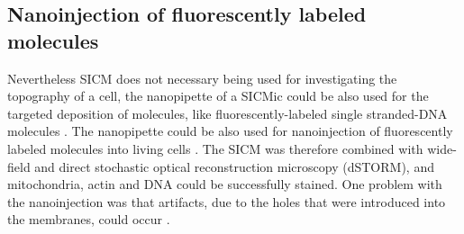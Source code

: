 
%

\subsection{Nanoinjection of fluorescently labeled molecules}

Nevertheless SICM does not necessary being used for investigating the topography of a cell, 
the nanopipette of a SICMic could be also used for the targeted deposition of molecules, like 
fluorescently-labeled single stranded-DNA molecules \cite{Ying2002,Hennig2015}. The nanopipette 
could be also used for nanoinjection of fluorescently labeled molecules into living cells 
\cite{Hennig2015a}. The SICM was therefore combined with wide-field and direct stochastic 
optical reconstruction microscopy (dSTORM), and mitochondria, actin and DNA could be successfully 
stained. One problem with the nanoinjection was that artifacts, due to the holes that were 
introduced into the membranes, could occur \cite{Hennig2015a}.

